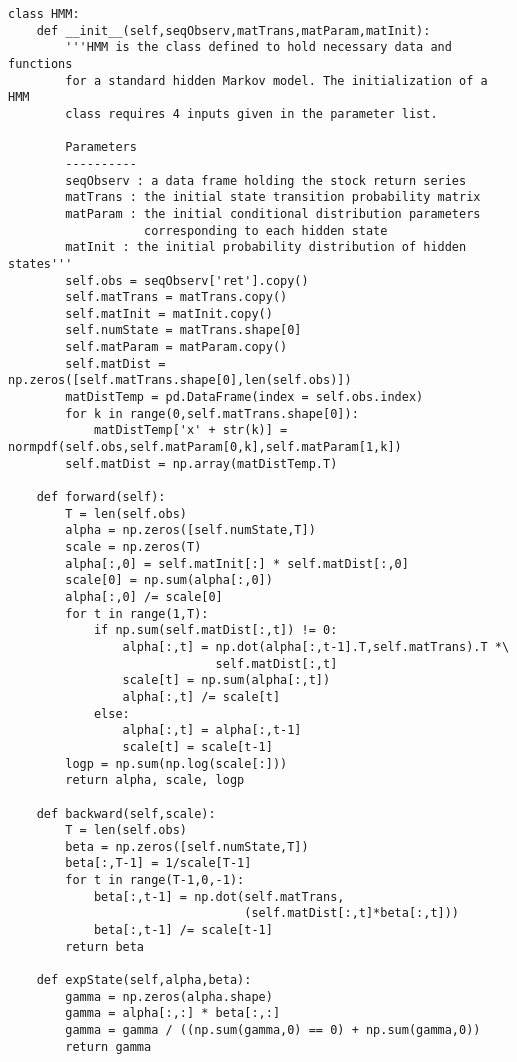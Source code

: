 \begin{spacing}{1.2}
\begin{lstlisting}
class HMM:
    def __init__(self,seqObserv,matTrans,matParam,matInit):
        '''HMM is the class defined to hold necessary data and functions 
        for a standard hidden Markov model. The initialization of a HMM 
        class requires 4 inputs given in the parameter list.
        
        Parameters
        ----------
        seqObserv : a data frame holding the stock return series
        matTrans : the initial state transition probability matrix
        matParam : the initial conditional distribution parameters 
                   corresponding to each hidden state
        matInit : the initial probability distribution of hidden states'''
        self.obs = seqObserv['ret'].copy()
        self.matTrans = matTrans.copy()
        self.matInit = matInit.copy()
        self.numState = matTrans.shape[0]
        self.matParam = matParam.copy()
        self.matDist = np.zeros([self.matTrans.shape[0],len(self.obs)])
        matDistTemp = pd.DataFrame(index = self.obs.index)
        for k in range(0,self.matTrans.shape[0]):
            matDistTemp['x' + str(k)] = normpdf(self.obs,self.matParam[0,k],self.matParam[1,k])
        self.matDist = np.array(matDistTemp.T)
    
    def forward(self):
        T = len(self.obs)
        alpha = np.zeros([self.numState,T])
        scale = np.zeros(T)
        alpha[:,0] = self.matInit[:] * self.matDist[:,0]
        scale[0] = np.sum(alpha[:,0])
        alpha[:,0] /= scale[0]
        for t in range(1,T):
            if np.sum(self.matDist[:,t]) != 0:
                alpha[:,t] = np.dot(alpha[:,t-1].T,self.matTrans).T *\
                             self.matDist[:,t]
                scale[t] = np.sum(alpha[:,t])
                alpha[:,t] /= scale[t]
            else:
                alpha[:,t] = alpha[:,t-1]
                scale[t] = scale[t-1] 
        logp = np.sum(np.log(scale[:]))
        return alpha, scale, logp
        
    def backward(self,scale):
        T = len(self.obs)
        beta = np.zeros([self.numState,T])
        beta[:,T-1] = 1/scale[T-1]
        for t in range(T-1,0,-1):
            beta[:,t-1] = np.dot(self.matTrans,
                                 (self.matDist[:,t]*beta[:,t]))
            beta[:,t-1] /= scale[t-1]
        return beta
        
    def expState(self,alpha,beta):
        gamma = np.zeros(alpha.shape)
        gamma = alpha[:,:] * beta[:,:]
        gamma = gamma / ((np.sum(gamma,0) == 0) + np.sum(gamma,0))
        return gamma
        

\end{lstlisting}
\end{spacing}
